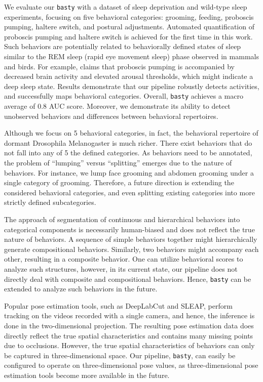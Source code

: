 We evaluate our \texttt{basty} with a dataset of sleep deprivation and wild-type sleep experiments, focusing on five behavioral categories: grooming, feeding, proboscis pumping, haltere switch, and postural adjustments.
Automated quantification of proboscis pumping and haltere switch is achieved for the first time in this work.
Such behaviors are potentially related to behaviorally defined states of sleep similar to the REM sleep (rapid eye movement sleep) phase observed in mammals and birds.
For example, \citet{van_alphen_deep_2021} claims that proboscis pumping is accompanied by decreased brain activity and elevated arousal thresholds, which might indicate a deep sleep state.
Results demonstrate that our pipeline robustly detects activities, and successfully maps behavioral categories.
Overall, \texttt{basty} achieves a macro average of 0.8 AUC score.
Moreover, we demonstrate its ability to detect unobserved behaviors and differences between behavioral repertoires.

Although we focus on 5 behavioral categories, in fact, the behavioral repertoire of dormant Drosophila Melanogaster is much richer. There exist behaviors that do not fall into any of 5 the defined categories.
As behaviors need to be annotated, the problem of ``lumping'' versus ``splitting'' emerges due to the nature of behaviors. For instance, we lump face grooming and abdomen grooming under a single category of grooming.
Therefore, a future direction is extending the considered behavioral categories, and even splitting existing categories into more strictly defined subcategories.

The approach of segmentation of continuous and hierarchical behaviors into categorical components is necessarily human-biased and does not reflect the true nature of behaviors.
A sequence of simple behaviors together might hierarchically generate compositional behaviors.
Similarly, two behaviors might accompany each other, resulting in a composite behavior.
One can utilize behavioral scores to analyze such structures, however, in its current state, our pipeline does not directly deal with composite and compositional behaviors.
Hence, \texttt{basty} can be extended to analyze such behaviors in the future.

Popular pose estimation tools, such as DeepLabCut and SLEAP, perform tracking on the videos recorded with a single camera, and hence, the inference is done in the two-dimensional projection.
The resulting pose estimation data does directly reflect the true spatial characteristics and contains  many missing points due to occlusions.
However, the true spatial characteristics of behaviors can only be captured in three-dimensional space.
Our pipeline, \texttt{basty}, can easily be configured to operate on three-dimensional pose values, as three-dimensional pose estimation tools become more available in the future.

